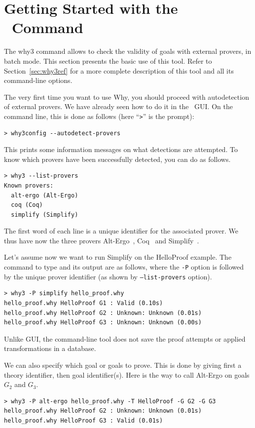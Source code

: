 \section{Getting Started with the \why\ Command}
\label{sec:batch}

The why3 command allows to check the validity of goals with external
provers, in batch mode. This section presents the basic use of this
tool. Refer to Section~\ref{sec:why3ref} for a more complete
description of this tool and all its command-line options.

The very first time you want to use Why, you should proceed with
autodetection of external provers. We have already seen how to do
it in the \why\ GUI. On the command line, this is done as follows
(here ``\texttt{>}'' is the prompt):
\begin{verbatim}
> why3config --autodetect-provers
\end{verbatim}
This prints some information messages on what detections are attempted. To know which
provers have been successfully detected, you can do as follows.
\begin{verbatim}
> why3 --list-provers
Known provers:
  alt-ergo (Alt-Ergo)
  coq (Coq)
  simplify (Simplify)
\end{verbatim}
The first word of each line is a unique identifier for the associated prover. We thus
have now the three provers Alt-Ergo~\cite{ergo}, Coq~\cite{CoqArt} and
Simplify~\cite{simplify05}. 

Let's assume now we want to run Simplify on the HelloProof
example. The command to type and its output are as follows, where the
\verb|-P| option is followed by the unique prover identifier (as shown
by \texttt{--list-provers} option).
\begin{verbatim}
> why3 -P simplify hello_proof.why
hello_proof.why HelloProof G1 : Valid (0.10s)
hello_proof.why HelloProof G2 : Unknown: Unknown (0.01s)
hello_proof.why HelloProof G3 : Unknown: Unknown (0.00s)
\end{verbatim}
Unlike \why GUI, the command-line tool does not save the proof attempts
or applied transformations in a database.

We can also specify which goal or goals to prove. This is done by giving
first a theory identifier, then goal identifier(s). Here is the way to
call Alt-Ergo on goals $G_2$ and $G_3$.
\begin{verbatim}
> why3 -P alt-ergo hello_proof.why -T HelloProof -G G2 -G G3
hello_proof.why HelloProof G2 : Unknown: Unknown (0.01s)
hello_proof.why HelloProof G3 : Valid (0.01s)
\end{verbatim}

